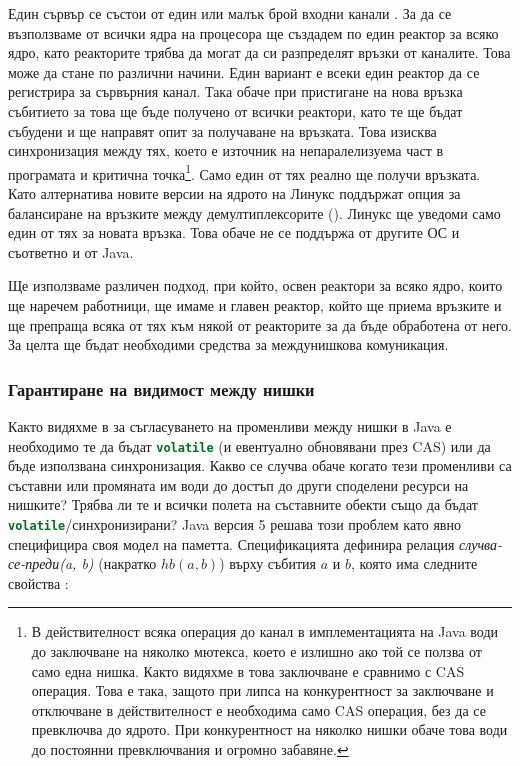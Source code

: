 Един сървър се състои от един или малък брой входни канали . За да се възползваме от всички ядра на процесора ще създадем по един реактор за всяко ядро, като реакторите трябва да могат да си разпределят връзки от каналите. Това може да стане по различни начини. Един вариант е всеки един реактор да се регистрира за сървърния канал. Така обаче при пристигане на нова връзка събитието за това ще бъде получено от всички реактори, като те ще бъдат събудени и ще направят опит за получаване на връзката. Това изисква синхронизация между тях, което е източник на непаралелизуема част в програмата и критична точка\footnote{В действителност всяка операция до канал в имплементацията на Java води до заключване на няколко мютекса, което е излишно ако той се ползва от само една нишка. Както видяхме в  това заключване е сравнимо с CAS операция. Това е така, защото при липса на конкурентност за заключване и отключване в действителност е необходима само CAS операция, без да се превключва до ядрото. При конкурентност на няколко нишки обаче това води до постоянни превключвания и огромно забавяне.}. Само един от тях реално ще получи връзката. Като алтернатива новите версии на ядрото на Линукс поддържат опция за балансиране на връзките между демултиплексорите (). Линукс ще уведоми само един от тях за новата връзка. Това обаче не се поддържа от другите ОС и съответно и от Java.

Ще използваме различен подход, при който, освен реактори за всяко ядро, които ще наречем работници, ще имаме и главен реактор, който ще приема връзките и ще препраща всяка от тях към някой от реакторите за да бъде обработена от него. За целта ще бъдат необходими средства за междунишкова комуникация.

\subsubsection{Гарантиране на видимост между нишки}

Както видяхме в  за съгласуването на променливи между нишки в Java е необходимо те да бъдат \lstinline[language=Java]{volatile} (и евентуално обновявани през CAS) или да бъде използвана синхронизация. Какво се случва обаче когато тези променливи са съставни или промяната им води до достъп до други споделени ресурси на нишките? Трябва ли те и всички полета на съставните обекти също да бъдат \lstinline[language=Java, breaklines=false]{volatile}/синхронизирани? Java версия 5 решава този проблем като явно специфицира своя модел на паметта. Спецификацията дефинира релация \emph{случва-се-преди(a, b)} (накратко $hb(a, b)$) върху събития $a$ и $b$, която има следните свойства \cite[секция 17.4.5]{gosling2015JLS8}:

